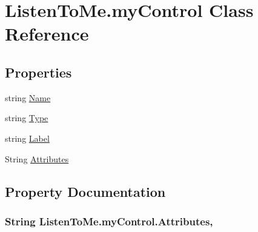 \hypertarget{class_listen_to_me_1_1my_control}{}\section{Listen\+To\+Me.\+my\+Control Class Reference}
\label{class_listen_to_me_1_1my_control}
\subsection*{Properties}
\begin{DoxyCompactItemize}
\item 
string \hyperlink{class_listen_to_me_1_1my_control_a22e3a9daa8044a66e4b4c3771e5b8184}{Name}
\item 
string \hyperlink{class_listen_to_me_1_1my_control_afd9026762fe27b7322e1546129523fbc}{Type}
\item 
string \hyperlink{class_listen_to_me_1_1my_control_a38784cdc14e4291a6724c78305785472}{Label}
\item 
String \hyperlink{class_listen_to_me_1_1my_control_a706bece7cb620d0f7802e938588d917e}{Attributes}
\end{DoxyCompactItemize}


\subsection{Property Documentation}
\subsubsection[{\texorpdfstring{Attributes}{Attributes}}]{\setlength{\rightskip}{0pt plus 5cm}String Listen\+To\+Me.\+my\+Control.\+Attributes\hspace{0.3cm}{\ttfamily [get]}, {\ttfamily [set]}}\hypertarget{class_listen_to_me_1_1my_control_a706bece7cb620d0f7802e938588d917e}{}\label{class_listen_to_me_1_1my_control_a706bece7cb620d0f7802e938588d917e}
